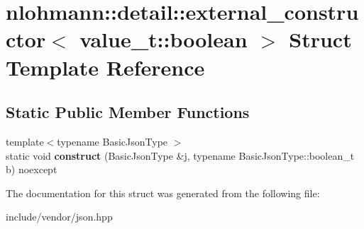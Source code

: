 \hypertarget{structnlohmann_1_1detail_1_1external__constructor_3_01value__t_1_1boolean_01_4}{}\section{nlohmann\+:\+:detail\+:\+:external\+\_\+constructor$<$ value\+\_\+t\+:\+:boolean $>$ Struct Template Reference}
\label{structnlohmann_1_1detail_1_1external__constructor_3_01value__t_1_1boolean_01_4}
\subsection*{Static Public Member Functions}
\begin{DoxyCompactItemize}
\item 
\mbox{\label{structnlohmann_1_1detail_1_1external__constructor_3_01value__t_1_1boolean_01_4_a867122bcf0856c757bd6bcbfb8be74bc}} 
{\footnotesize template$<$typename Basic\+Json\+Type $>$ }\\static void {\bfseries construct} (Basic\+Json\+Type \&j, typename Basic\+Json\+Type\+::boolean\+\_\+t b) noexcept
\end{DoxyCompactItemize}


The documentation for this struct was generated from the following file\+:\begin{DoxyCompactItemize}
\item 
include/vendor/json.\+hpp\end{DoxyCompactItemize}
